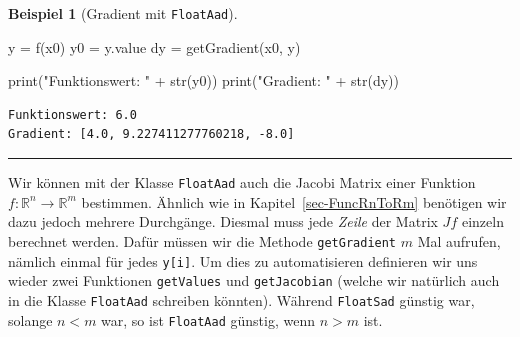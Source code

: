 \documentclass[
  a4paper,
  DIV=11]{scrreprt}
\newenvironment{Shaded}{\begin{snugshade}}{\end{snugshade}}
\newcommand{\BuiltInTok}[1]{\textcolor[rgb]{0.00,0.23,0.31}{#1}}
\newcommand{\NormalTok}[1]{\textcolor[rgb]{0.00,0.23,0.31}{#1}}
\newcommand{\OperatorTok}[1]{\textcolor[rgb]{0.37,0.37,0.37}{#1}}
\newcommand{\StringTok}[1]{\textcolor[rgb]{0.13,0.47,0.30}{#1}}
\theoremstyle{definition}
\theoremstyle{definition}
\newtheorem{example}{Beispiel}[chapter]
\theoremstyle{remark}
\begin{document}
\begin{example}[Gradient mit
\texttt{FloatAad}]
\begin{Shaded}
\begin{Highlighting}[]
\NormalTok{y }\OperatorTok{=}\NormalTok{ f(x0)}
\NormalTok{y0 }\OperatorTok{=}\NormalTok{ y.value}
\NormalTok{dy }\OperatorTok{=}\NormalTok{ getGradient(x0, y)}

\BuiltInTok{print}\NormalTok{(}\StringTok{"Funktionswert: "} \OperatorTok{+} \BuiltInTok{str}\NormalTok{(y0))}
\BuiltInTok{print}\NormalTok{(}\StringTok{"Gradient: "} \OperatorTok{+} \BuiltInTok{str}\NormalTok{(dy))}
\end{Highlighting}
\end{Shaded}

\begin{verbatim}
Funktionswert: 6.0
Gradient: [4.0, 9.227411277760218, -8.0]
\end{verbatim}

\end{example}

\begin{center}\rule{0.5\linewidth}{0.5pt}\end{center}

Wir können mit der Klasse \texttt{FloatAad} auch die Jacobi Matrix einer
Funktion \(f : \mathbb{R}^n \rightarrow \mathbb{R}^m\) bestimmen.
Ähnlich wie in Kapitel~\ref{sec-FuncRnToRm} benötigen wir dazu jedoch
mehrere Durchgänge. Diesmal muss jede \emph{Zeile} der Matrix \(Jf\)
einzeln berechnet werden. Dafür müssen wir die Methode
\texttt{getGradient} \(m\) Mal aufrufen, nämlich einmal für jedes
\texttt{y{[}i{]}}. Um dies zu automatisieren definieren wir uns wieder
zwei Funktionen \texttt{getValues} und \texttt{getJacobian} (welche wir
natürlich auch in die Klasse \texttt{FloatAad} schreiben könnten).
Während \texttt{FloatSad} günstig war, solange \(n<m\) war, so ist
\texttt{FloatAad} günstig, wenn \(n>m\) ist.
\end{document}
